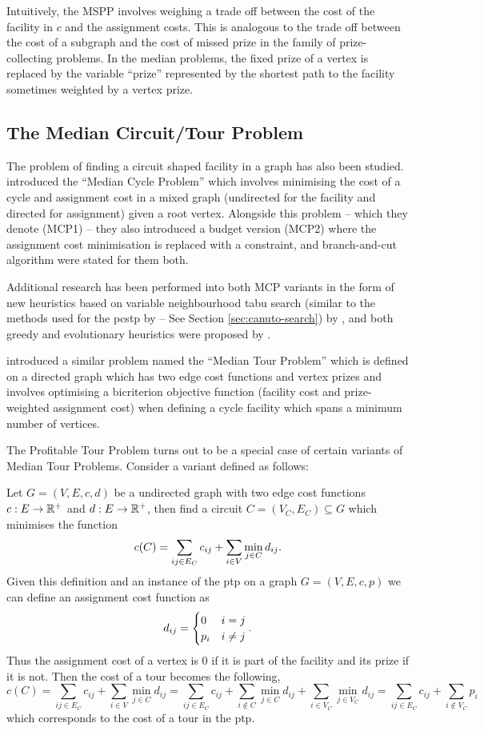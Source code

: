  Intuitively, the MSPP involves weighing a trade off between the cost of the facility
 in $c$ and the assignment costs. 
 This is analogous to the trade off between the cost of a subgraph and the cost of missed prize in the
 family of prize-collecting problems. In the median problems, the fixed prize of a vertex is
 replaced by the variable ``prize'' represented by the shortest path to the facility sometimes weighted
 by a vertex prize.
 \subsection{The Median Circuit/Tour Problem}
 The problem of finding a circuit shaped facility in a graph has also been studied.
 \citet{labbe1999themedian} introduced the ``Median Cycle Problem'' which involves
 minimising the cost of a cycle and assignment cost in a mixed graph (undirected for
 the facility and directed for assignment) given a root vertex. Alongside this problem
 -- which they denote (MCP1) -- they also introduced a budget version (MCP2) where the
 assignment cost minimisation is replaced with a constraint, and branch-and-cut algorithm
 were stated for them both.

 Additional research has been performed into both MCP variants
 in the form of new heuristics based on variable neighbourhood tabu search
 (similar to the methods used for the \gls{pcstp} by \citet{canuto2001local} --
 See Section \ref{sec:canuto-search}) by \citet{perez2003variable}, and both
 greedy and evolutionary heuristics were proposed by \citet{renaud2004efficient}.
 
 \citet{current1994median} introduced a similar problem named the ``Median Tour Problem''
 which is defined on a directed graph which has two edge cost functions and vertex prizes
 and involves optimising a bicriterion objective function
 (facility cost and prize-weighted assignment cost)
 when defining a cycle facility which spans a minimum number of vertices.

 The Profitable Tour Problem turns out to be a special case of certain variants of Median
 Tour Problems. Consider a variant defined as follows:
 
 Let $G = (V, E, c, d)$ be a undirected graph with two edge cost functions
 $c : E \to \mathbb{R}^+$ and $d : E \to \mathbb{R}^+$, then find a circuit $C = (V_C, E_C) \subseteq G$
 which minimises
 the function
 \[c(C) = \sum_{ij \in E_C} c_{ij} + \sum_{i \in V} \min_{j \in C} d_{ij} \mathnormal{.}\]
 Given this definition and an instance of the \gls{ptp} on a graph $G = (V, E, c, p)$
 we can define an assignment cost function as
 $$d_{ij} =
 \begin{cases}
   0 & i = j \\
   p_i & i \neq j
 \end{cases}\mathnormal{.}
 $$
 Thus the assignment cost of a vertex is 0 if it is part of the facility and its prize
 if it is not. Then the cost of a tour becomes the following,
 $$c(C) = \sum_{ij \in E_C} c_{ij} + \sum_{i \in V} \min_{j \in C} d_{ij} =
 \sum_{ij \in E_C} c_{ij} + \sum_{i \not\in C} \min_{j \in C} d_{ij} + \sum_{i \in V_C} \min_{j \in V_C} d_{ij}
 = \sum_{ij \in E_C} c_{ij} + \sum_{i \not\in V_C}  p_i$$
 which corresponds to the cost of a tour in the \gls{ptp}.
